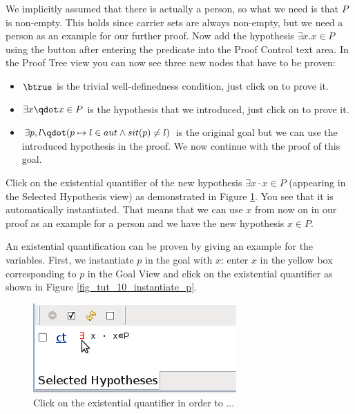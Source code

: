 We implicitly assumed that there is actually a person, so what we need is that $P$ is non-empty. 
This holds since carrier sets are always non-empty, but we need a person as an example for our further proof. 
Now add the hypothesis $\exists x . x \in P$ using the  button after entering the predicate into the \textsf{Proof Control} text area. 
In the \textsf{Proof Tree} view you can now see three new nodes that have to be proven:
\begin{itemize}
\item $\btrue$ is the trivial well-definedness condition, just click on  to prove it.
\item $\exists x\qdot x\in P$ is the hypothesis that we introduced, just click on  to prove it.
\item $\exists p, l\qdot (p \mapsto  l \in  aut \land  sit(p) \neq  l)$ is the original goal
  but we can use the introduced hypothesis in the proof. We now continue with the proof of this goal.
\end{itemize}

Click on the existential quantifier of the new hypothesis $\exists x \cdot x \in P$
  (appearing in the \textsf{Selected Hypothesis} view) as demonstrated in Figure \ref{fig_tut_10_instantiate_x}.
You see that it is automatically instantiated. That means that we can use $x$ from now on in our proof as an example for a person
  and we have the new hypothesis $x \in P$.

An existential quantification can be proven by giving an example for the variables. First, we
  instantiate $p$ in the goal with $x$: enter $x$ in the yellow box corresponding to $p$ 
  in the \textsf{Goal View} and click on the existential quantifier as shown in Figure \ref{fig_tut_10_instantiate_p}. 

\begin{figure}[!ht]
\begin{center}
	\includegraphics{img/tutorial/tut_10_instantiate_x.png}
	\caption{Click on the existential quantifier in order to ...}
	\label{fig_tut_10_instantiate_x}
\end{center}
\end{figure}

